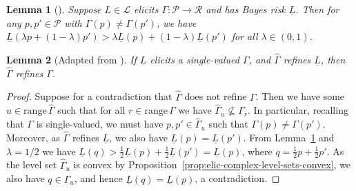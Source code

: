 \documentclass[11pt]{article} %
\newcommand{\range}{\mathrm{range}\,}
\renewcommand{\L}{\mathcal{L}}
\newcommand{\R}{\mathcal{R}}
\renewcommand{\P}{\mathcal{P}}
\newcommand{\lbar}{\underline{L}} %
\newtheorem{lemma}{Lemma}
\begin{document}
\begin{lemma}[{\citet[Lemma 8]{frongillo2020elicitation}}]
  \label{lem:elic-complex-bayes-concave}
  Suppose $L \in \L$ elicits $\Gamma:\P\to\R$ and has Bayes risk $\lbar$.
  Then for any $p,p'\in\P$ with $\Gamma(p)\neq\Gamma(p')$, we have $\lbar(\lambda p + (1-\lambda) p') > \lambda \lbar(p) + (1-\lambda) \lbar(p')$ for all $\lambda\in(0,1)$.
\end{lemma}

\begin{lemma}[{Adapted from \citet[Theorem 4]{frongillo2020elicitation}}]
  \label{lem:bayes-risk-lower-bound}
  If $L$ elicits a single-valued $\Gamma$, and $\hat\Gamma$ refines $\lbar$, then $\hat\Gamma$ refines $\Gamma$.
\end{lemma}
\begin{proof}
  Suppose for a contradiction that $\hat\Gamma$ does not refine $\Gamma$.
  Then we have some $u\in\range\hat\Gamma$ such that for all $r\in\range\Gamma$ we have $\hat\Gamma_u \not\subseteq \Gamma_r$.
  In particular, recalling that $\Gamma$ is single-valued, we must have $p,p'\in\hat\Gamma_u$ such that $\Gamma(p) \neq \Gamma(p')$.
  Moreover, as $\hat\Gamma$ refines $\lbar$, we also have $\lbar(p) = \lbar(p')$.
  From Lemma~\ref{lem:elic-complex-bayes-concave} and $\lambda=1/2$ we have $\lbar(q) > \tfrac 1 2 \lbar(p) + \tfrac 1 2 \lbar(p') = \lbar(p)$, where $q = \tfrac 1 2 p + \tfrac 1 2 p'$.
  As the level set $\hat\Gamma_u$ is convex by Proposition~\ref{prop:elic-complex-level-sets-convex}, we also have $q \in \hat\Gamma_u$, and hence $\lbar(q)=\lbar(p)$, a contradiction.
\end{proof}
\end{document}
